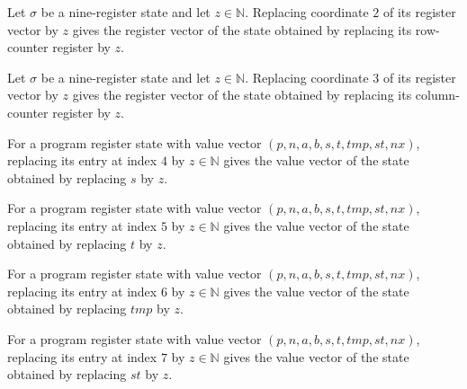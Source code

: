 \begin{lemma}
\label{Complexity.LogProg.PReg.u_2}
\leanok
{}
Let $\sigma$ be a nine-register state and let $z\in\mathbb{N}$. Replacing coordinate $2$
of its register vector by $z$ gives the register vector of the state obtained by
replacing its row-counter register by $z$.
\end{lemma}

\begin{lemma}
\label{Complexity.LogProg.PReg.u_3}
\leanok
{}
Let $\sigma$ be a nine-register state and let $z\in\mathbb{N}$. Replacing coordinate $3$
of its register vector by $z$ gives the register vector of the state obtained by
replacing its column-counter register by $z$.
\end{lemma}

\begin{lemma}
\label{Complexity.LogProg.PReg.u_4}
\leanok
{}
For a program register state with value vector $(p,n,a,b,s,t,tmp,st,nx)$, replacing its
entry at index $4$ by $z\in\mathbb{N}$ gives the value vector of the state obtained by
replacing $s$ by $z$.
\end{lemma}

\begin{lemma}
\label{Complexity.LogProg.PReg.u_5}
\leanok
{}
For a program register state with value vector $(p,n,a,b,s,t,tmp,st,nx)$, replacing its
entry at index $5$ by $z\in\mathbb{N}$ gives the value vector of the state obtained by
replacing $t$ by $z$.
\end{lemma}

\begin{lemma}
\label{Complexity.LogProg.PReg.u_6}
\leanok
{}
For a program register state with value vector $(p,n,a,b,s,t,tmp,st,nx)$, replacing its
entry at index $6$ by $z\in\mathbb{N}$ gives the value vector of the state obtained by
replacing $tmp$ by $z$.
\end{lemma}

\begin{lemma}
\label{Complexity.LogProg.PReg.u_7}
\leanok
{}
For a program register state with value vector $(p,n,a,b,s,t,tmp,st,nx)$, replacing its
entry at index $7$ by $z\in\mathbb{N}$ gives the value vector of the state obtained by
replacing $st$ by $z$.
\end{lemma}

